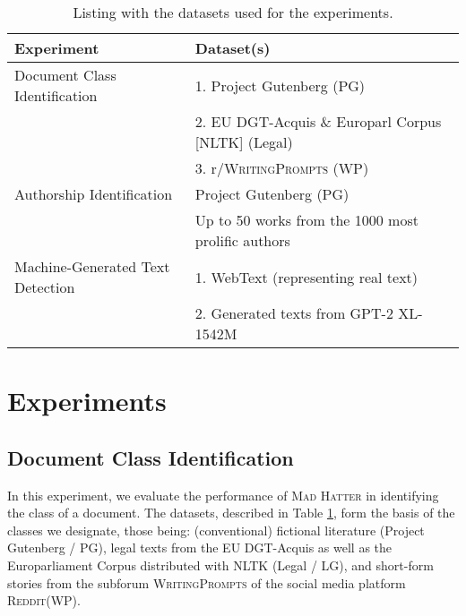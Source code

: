 \begin{table}[htbp]
    \centering
    \begin{tabular}{ll}
        \toprule
        Experiment & Dataset(s) \\
        \midrule
        Document Class Identification & 1. Project Gutenberg (PG) \\
        & 2. EU DGT-Acquis \& Europarl Corpus [NLTK] (Legal) \\
        & 3. r/\textsc{WritingPrompts} (WP) \\
        \midrule
        Authorship Identification & Project Gutenberg (PG) \\
        & Up to 50 works from the 1000 most prolific authors \\
        \midrule
        Machine-Generated Text Detection & 1. WebText (representing real text)  \\
        & 2. Generated texts from GPT-2 XL-1542M\\

        
        \bottomrule 
    \end{tabular}
    \caption{Listing with the datasets used for the experiments.}
    \label{tab:used_datasets}
\end{table}


\section{Experiments}

\subsection{Document Class Identification}
\label{sec:document_class_identification}
In this experiment, we evaluate the performance of \textsc{Mad Hatter} in identifying the class of a document. The datasets, described in Table \ref{tab:used_datasets}, form the basis of the classes we designate, those being: (conventional) fictional literature (Project Gutenberg / PG), legal texts from the EU DGT-Acquis as well as the Europarliament Corpus distributed with NLTK (Legal / LG), and short-form stories from the subforum \textsc{WritingPrompts} of the social media platform \textsc{Reddit}(WP). 

